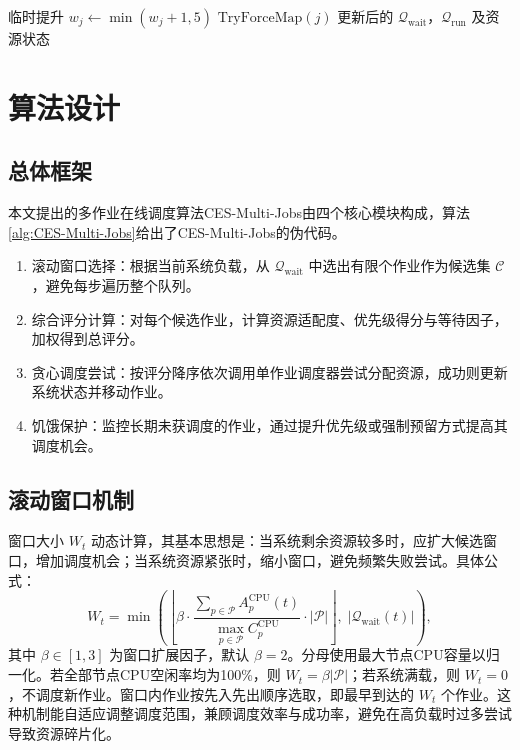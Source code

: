 \begin{algorithm}[htbp]
\begin{algorithmic}[1]
             
                    \State 临时提升 $w_j \gets \min(w_j+1, 5)$  
                \EndIf
                    \State $\text{TryForceMap}(j)$  
                \EndIf
            \EndFor
        \EndFor
        \Ensure 更新后的 $\mathcal{Q}_{\text{wait}}$，$\mathcal{Q}_{\text{run}}$ 及资源状态
    \end{algorithmic}
\end{algorithm}

\section{算法设计}
\subsection{总体框架}
本文提出的多作业在线调度算法CES-Multi-Jobs由四个核心模块构成，算法\ref{alg:CES-Multi-Jobs}给出了CES-Multi-Jobs的伪代码。

\begin{enumerate}[topsep = 0 pt, itemsep= 0 pt, parsep=0pt, partopsep=0pt, leftmargin=0pt, itemindent=48pt, labelsep=0pt, listparindent=24pt, label=（\arabic*）]
    \item 滚动窗口选择：根据当前系统负载，从 $\mathcal{Q}_{\text{wait}}$ 中选出有限个作业作为候选集 $\mathcal{C}$，避免每步遍历整个队列。
    \item 综合评分计算：对每个候选作业，计算资源适配度、优先级得分与等待因子，加权得到总评分。
    \item 贪心调度尝试：按评分降序依次调用单作业调度器尝试分配资源，成功则更新系统状态并移动作业。
    \item 饥饿保护：监控长期未获调度的作业，通过提升优先级或强制预留方式提高其调度机会。
\end{enumerate}

\subsection{滚动窗口机制}
窗口大小 $W_t$ 动态计算，其基本思想是：当系统剩余资源较多时，应扩大候选窗口，增加调度机会；当系统资源紧张时，缩小窗口，避免频繁失败尝试。具体公式：
\begin{equation}
    W_t = \min\left( \left\lfloor \beta \cdot \frac{\sum_{p \in \mathcal{P}} A_p^{\text{CPU}}(t)}{\max_{p \in \mathcal{P}} C_p^{\text{CPU}}} \cdot |\mathcal{P}| \right\rfloor,\; |\mathcal{Q}_{\text{wait}}(t)| \right),
\end{equation}
其中 $\beta \in [1,3]$ 为窗口扩展因子，默认 $\beta=2$。分母使用最大节点CPU容量以归一化。若全部节点CPU空闲率均为100\%，则 $W_t = \beta |\mathcal{P}|$；若系统满载，则 $W_t=0$，不调度新作业。窗口内作业按先入先出顺序选取，即最早到达的 $W_t$ 个作业。这种机制能自适应调整调度范围，兼顾调度效率与成功率，避免在高负载时过多尝试导致资源碎片化。

